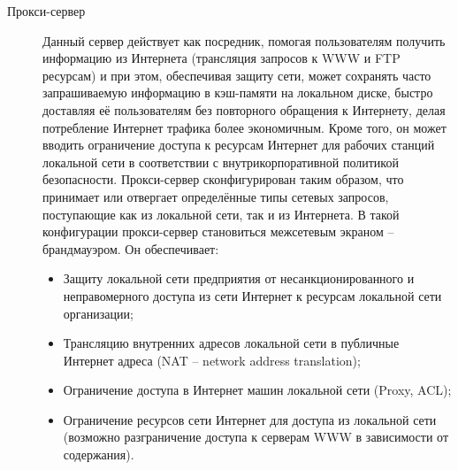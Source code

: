 \begin{description}
\item[Прокси-сервер]
  Данный сервер действует как посредник, помогая пользователям получить информацию из Интернета (трансляция запросов к WWW и FTP ресурсам) и при этом, обеспечивая защиту сети, может сохранять часто запрашиваемую информацию в кэш-памяти на локальном диске, быстро доставляя её пользователям без повторного обращения к Интернету, делая потребление Интернет трафика более экономичным. Кроме того, он может вводить ограничение доступа к ресурсам Интернет для рабочих станций локальной сети в соответствии с внутрикорпоративной политикой безопасности.
  Прокси-сервер сконфигурирован таким образом, что принимает или отвергает определённые типы сетевых запросов, поступающие как из локальной сети, так и из Интернета. В такой конфигурации прокси-сервер становиться межсетевым экраном – брандмауэром. Он обеспечивает:
  \begin{itemize}
  \item Защиту локальной сети предприятия от несанкционированного и неправомерного доступа из сети Интернет к ресурсам локальной сети организации;
  \item Трансляцию внутренних адресов локальной сети в публичные Интернет адреса (NAT – network address translation);
  \item Ограничение доступа в Интернет машин локальной сети (Proxy, ACL);
  \item Ограничение ресурсов сети Интернет для доступа из локальной сети (возможно разграничение доступа к серверам WWW в зависимости от содержания).
  \end{itemize}
\end{description}